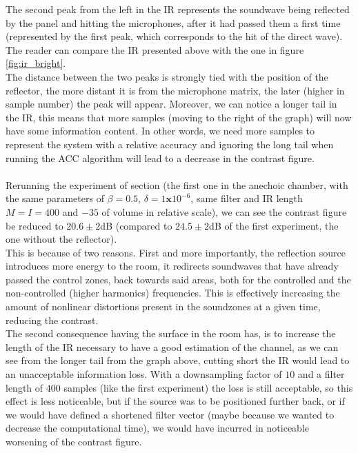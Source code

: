 The second peak from the left in the IR represents the soundwave being reflected by the panel and hitting the microphones, after it had passed them a first time (represented by the first peak, which corresponds to the hit of the direct wave). The reader can compare the IR presented above with the one in figure \ref{fig:ir_bright}.
\\
The distance between the two peaks is strongly tied with the position of the reflector, the more distant it is from the microphone matrix, the later (higher in sample number) the peak will appear. Moreover, we can notice a longer tail in the IR, this means that more samples (moving to the right of the graph) will now have some information content. In other words, we need more samples to represent the system with a relative accuracy and ignoring the long tail when running the ACC algorithm will lead to a decrease in the contrast figure.
\\
\\
Rerunning the experiment of section\label{subsec:baccrdanechoic} (the first one in the anechoic chamber, with the same parameters of $\beta=0.5$, $\delta=1\textbf{x}10^{-6}$, same filter and IR length $M=I=400$ and $-35$ of volume in relative scale), we can see the contrast figure be reduced to $20.6\pm2$dB (compared to $24.5\pm2$dB of the first experiment, the one without the reflector).
\\
This is because of two reasons. First and more importantly, the reflection source introduces more energy to the room, it redirects soundwaves that have already passed the control zones, back towards said areas, both for the controlled and the non-controlled (higher harmonics) frequencies. This is effectively increasing the amount of nonlinear distortions present in the soundzones at a given time, reducing the contrast.
\\
The second consequence having the surface in the room has, is to increase the length of the IR necessary to have a good estimation of the channel, as we can see from the longer tail from the graph above, cutting short the IR would lead to an unacceptable information loss. With a downsampling factor of $10$ and a filter length of $400$ samples (like the first experiment) the loss is still acceptable, so this effect is less noticeable, but if the source was to be positioned further back, or if we would have defined a shortened filter vector (maybe because we wanted to decrease the computational time), we would have incurred in noticeable worsening of the contrast figure.
\\
